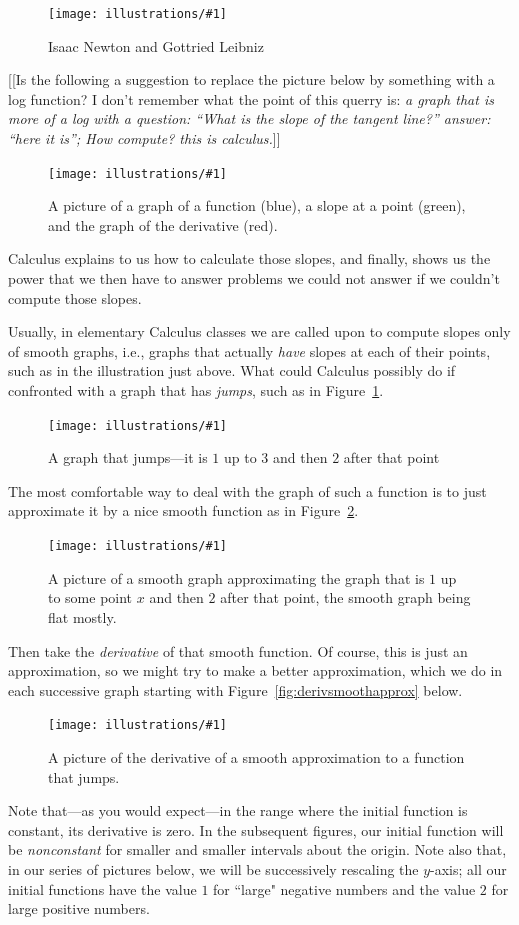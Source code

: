 \documentclass[11pt]{article}
\newcommand{\ill}[3]{ 
   \begin{figure}[H]
   \begin{center}
   \texttt{[image: illustrations/\#1]}
   \caption{#3}
   \end{center}
    \end{figure}
}
\theoremstyle{plain}
\theoremstyle{definition}
\numberwithin{equation}{section}
\numberwithin{figure}{section}
\numberwithin{table}{section}
\begin{document}
\ill{newton-leibniz}{0.5}{Isaac Newton and Gottried Leibniz}

[[Is the following a suggestion to replace the picture below by something with a log function?  I don't remember what the point of this querry is: {\em a graph that is more of a log with a question: ``What is the slope
of the tangent line?'' answer: ``here it is''; How compute?  this is
calculus.}]] 
   
   
\ill{graph_slope_deriv}{0.6}{A picture of a graph of a function (blue), a slope at a point (green), and the graph of the derivative (red).}
      
\noindent Calculus explains to us how to calculate those slopes, and
finally, shows us the power that we then have to answer problems we
could not answer if we couldn't compute those slopes.


Usually, in elementary Calculus classes we are called upon to compute
slopes only of smooth graphs, i.e., graphs that actually {\em have}
slopes at each of their points, such as in the illustration just
above.  What could Calculus possibly do if confronted with a graph
that has {\em jumps}, such as in Figure~\ref{fig:jump}.
 
\ill{jump}{0.5}{A graph that jumps---it is $1$ up to $3$ and then $2$ after that point\label{fig:jump}}
  
The most comfortable way to deal with the graph of such a function is
to just approximate it by a nice smooth function as in
Figure~\ref{fig:jumpsmooth}.
    
   
\ill{jump-smooth}{0.5}{A picture of a smooth graph approximating the
  graph that is $1$ up to some point $x$ and then $2$ after that
  point, the smooth graph being flat mostly.\label{fig:jumpsmooth}}


Then take the {\em derivative} of that smooth function.  Of course,
this is just an approximation, so we might try to make a better
approximation, which we do in each successive graph starting
with Figure~\ref{fig:derivsmoothapprox} below.


\ill{jump-smooth-deriv-7}{0.6}{A picture of the derivative of
a smooth approximation to a function that jumps.\label{fig:djump1}}

Note that---as you would expect---in the range where the initial
function is constant, its derivative is zero. In the subsequent
figures, our initial function will be {\it nonconstant} for smaller
and smaller intervals about the origin. Note also that, in our series
of pictures below, we will be successively rescaling the $y$-axis; all
our initial functions have the value $1$ for ``large" negative numbers
and the value $2$ for large positive numbers.
\end{document}
